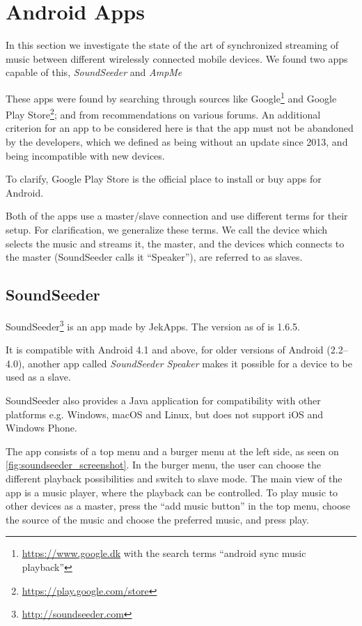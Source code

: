 \section{Android Apps}\label{sec:sota_apps}
In this section we investigate the state of the art of synchronized streaming of music between different wirelessly connected mobile devices.
We found two apps capable of this, \textit{SoundSeeder} and \textit{AmpMe}

These apps were found by searching through sources like Google\footnote{\url{https://www.google.dk} with the search terms ``android sync music playback''} and Google Play Store\footnote{\url{https://play.google.com/store}}; and from recommendations on various forums.
An additional criterion for an app to be considered here is that the app must not be abandoned by the developers,
which we defined as being without an update since 2013, and being incompatible with new devices.

To clarify, Google Play Store is the official place to install or buy apps for Android.

Both of the apps use a master/slave connection and use different terms for their setup.
For clarification, we generalize these terms.
We call the device which selects the music and streams it, the master, and the devices which connects to the master (SoundSeeder calls it ``Speaker''), are referred to as slaves.

\subsection{SoundSeeder}\label{subsec:soundseeder}
SoundSeeder\footnote{\url{http://soundseeder.com}} is an app made by JekApps.
The version as of  is 1.6.5.

It is compatible with Android 4.1 and above, for older versions of Android (2.2--4.0),
another app called \textit{SoundSeeder Speaker} makes it possible for a device to be used as a slave.

SoundSeeder also provides a Java application for compatibility with other platforms e.g. Windows, macOS and Linux, but does not support iOS and Windows Phone\cite{soundseeder_ios}.

The app consists of a top menu and a burger menu at the left side, as seen on \cref{fig:soundseeder_screenshot}.
In the burger menu, the user can choose the different playback possibilities and switch to slave mode.
The main view of the app is a music player, where the playback can be controlled.
To play music to other devices as a master, press the ``add music button'' in the top menu,
choose the source of the music and choose the preferred music, and press play.

